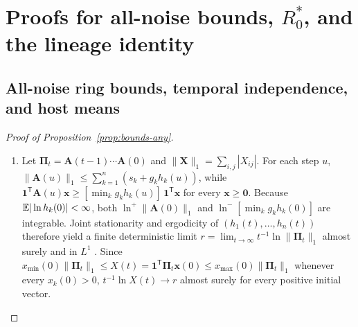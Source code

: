 \section{Proofs for all-noise bounds, \texorpdfstring{$R_0^*$}{R0*}, and the lineage identity}\label{app:bounds}

\subsection{All-noise ring bounds, temporal independence, and host means}\label{subsec:app-bounds-any}

\begin{proof}[Proof of Proposition~{\upshape\ref{prop:bounds-any}}]
\begin{enumerate}
\item[(a)] Let $\boldsymbol{\Pi}_t = \mathbf{A}(t - 1)\cdots\mathbf{A}(0)$ and $\|\mathbf{X}\|_1 = \sum_{i,j} |X_{ij}|$. For each step $u$, $\|\mathbf{A}(u)\|_1 \le \sum_{k=1}^n (s_k + g_k h_k(u))$, while $\mathbf{1}^{\mathsf{T}}\mathbf{A}(u)\mathbf{x} \ge [\min_k g_k h_k(u)]\,\mathbf{1}^{\mathsf{T}}\mathbf{x}$ for every $\mathbf{x} \ge \mathbf{0}$. Because $\mathbb{E}|\ln h_k(0)| < \infty$, both $\ln^+\|\mathbf{A}(0)\|_1$ and $\ln^-[\min_k g_k h_k(0)]$ are integrable. Joint stationarity and ergodicity of $(h_1(t), \dots, h_n(t))$ therefore yield a finite deterministic limit $r = \lim_{t \to \infty} t^{-1}\ln\|\boldsymbol{\Pi}_t\|_1$ almost surely and in $L^1$ \citep{furstenberg1960}. Since $x_{\min}(0)\|\boldsymbol{\Pi}_t\|_1 \le X(t) = \mathbf{1}^{\mathsf{T}}\boldsymbol{\Pi}_t\mathbf{x}(0) \le x_{\max}(0)\|\boldsymbol{\Pi}_t\|_1$ whenever every $x_k(0) > 0$, $t^{-1}\ln X(t) \to r$ almost surely for every positive initial vector.


\end{enumerate}
\end{proof}
